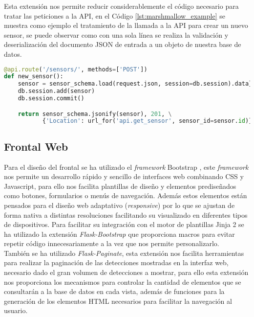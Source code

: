 \documentclass[../proyecto.tex]{subfiles}
\begin{document}
Esta extensión nos permite reducir considerablemente el código necesario para tratar las peticiones a la API, en el Código \ref{lst:marshmallow_example} se muestra como ejemplo el tratamiento de la llamada a la API para crear un nuevo sensor, se puede observar como con una sola línea se realiza la validación y deserialización del documento JSON de entrada a un objeto de nuestra base de datos.\\

\begin{minipage}{\linewidth}
\begin{lstlisting}[language=Python, caption=Ejemplo de funcionamiento de Flask-Marshmallow, label={lst:marshmallow_example},captionpos=b, frame=single]
@api.route('/sensors/', methods=['POST'])
def new_sensor():
    sensor = sensor_schema.load(request.json, session=db.session).data}
    db.session.add(sensor)
    db.session.commit()

    return sensor_schema.jsonify(sensor), 201, \
           {'Location': url_for('api.get_sensor', sensor_id=sensor.id)}
\end{lstlisting}
\end{minipage}

\subsection{Frontal Web}

Para el diseño del frontal se  ha utilizado el \textit{framework} Bootstrap \cite{bootstrap_frontend_framework}, este \textit{framework} nos permite un desarrollo rápido y sencillo de interfaces web combinando CSS y Javascript, para ello nos facilita plantillas de diseño y elementos prediseñados como botones, formularios o menús de navegación. Además estos elementos están pensados para el diseño web adaptativo (\textit{responsive}) por lo que se ajustan de forma nativa a distintas resoluciones facilitando su visualizado en diferentes tipos de dispositivos. Para facilitar su integración con el motor de plantillas Jinja 2 se ha utilizado la extensión \textit{Flask-Bootstrap} \cite{flask_bootstrap} que proporciona macros para evitar repetir código innecesariamente a la vez que nos permite personalizarlo.\\

También se ha utilizado \textit{Flask-Paginate}, esta extensión nos facilita herramientas para realizar la paginación de las detecciones mostradas en la interfaz web, necesario dado el gran volumen de detecciones a mostrar, para ello esta extensión nos proporciona los mecanismos para controlar la cantidad de elementos que se consultarán a la base de datos en cada vista, además de funciones para la generación de los elementos HTML necesarios para facilitar la navegación al usuario. \\
\end{document}
